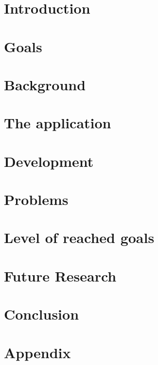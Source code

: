 \documentclass[a4paper,pt12]{article}
\begin{document}
\tableofcontents
\newpage

\section{Introduction}
\label{sec:introduction}



\section{Goals}
\label{sec:goals}


\section{Background}
\label{sec:background}


\section{The application}
\label{sec:application}


\section{Development}
\label{sec:development}


\section{Problems}
\label{sec:problems}


\section{Level of reached goals}
\label{sec:levelOfReachedGoals}


%

\section{Future Research}
\label{sec:futureResearch}


\section{Conclusion}
\label{sec:conclusion}


\newpage

%
%

\newpage
\section{Appendix}

\end{document}
